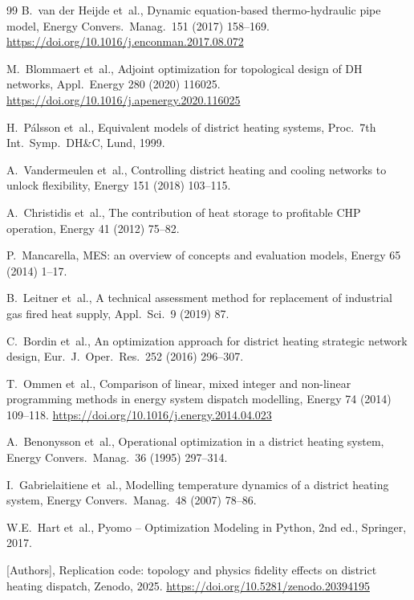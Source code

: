 \documentclass[review,3p]{elsarticle}
\begin{document}
\begin{thebibliography}{99}
B.~van der Heijde et~al.,
Dynamic equation-based thermo-hydraulic pipe model,
Energy Convers.\ Manag.\ 151 (2017) 158--169.
\url{https://doi.org/10.1016/j.enconman.2017.08.072}

M.~Blommaert et~al.,
Adjoint optimization for topological design of DH networks,
Appl.\ Energy 280 (2020) 116025.
\url{https://doi.org/10.1016/j.apenergy.2020.116025}

H.~P\'{a}lsson et~al.,
Equivalent models of district heating systems,
Proc.\ 7th Int.\ Symp.\ DH\&C, Lund, 1999.

A.~Vandermeulen et~al.,
Controlling district heating and cooling networks to unlock
flexibility,
Energy 151 (2018) 103--115.

A.~Christidis et~al.,
The contribution of heat storage to profitable CHP operation,
Energy 41 (2012) 75--82.

P.~Mancarella,
MES: an overview of concepts and evaluation models,
Energy 65 (2014) 1--17.

B.~Leitner et~al.,
A technical assessment method for replacement of industrial gas fired
heat supply,
Appl.\ Sci.\ 9 (2019) 87.

C.~Bordin et~al.,
An optimization approach for district heating strategic network
design,
Eur.\ J.\ Oper.\ Res.\ 252 (2016) 296--307.

T.~Ommen et~al.,
Comparison of linear, mixed integer and non-linear programming
methods in energy system dispatch modelling,
Energy 74 (2014) 109--118.
\url{https://doi.org/10.1016/j.energy.2014.04.023}

A.~Benonysson et~al.,
Operational optimization in a district heating system,
Energy Convers.\ Manag.\ 36 (1995) 297--314.

I.~Gabrielaitiene et~al.,
Modelling temperature dynamics of a district heating system,
Energy Convers.\ Manag.\ 48 (2007) 78--86.

W.E.~Hart et~al.,
Pyomo -- Optimization Modeling in Python, 2nd ed., Springer, 2017.

[Authors], Replication code: topology and physics fidelity effects on
district heating dispatch, Zenodo, 2025.
\url{https://doi.org/10.5281/zenodo.20394195}

\end{thebibliography}
\end{document}
